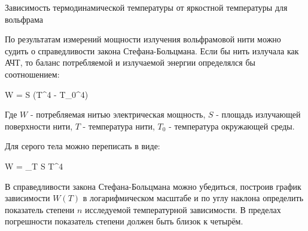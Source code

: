 {Зависимость термодинамической температуры от яркостной температуры для вольфрама}

По результатам измерений мощности излучения вольфрамовой нити можно судить о
справедливости закона Стефана-Больцмана. Если бы нить излучала как АЧТ, то баланс
потребляемой и излучаемой энергии определялся бы соотношением:

{ W = \sigma S (T^4 - T_0^4) }

Где $ W $ - потребляемая нитью электрическая мощность, $ S $ - площадь излучающей
поверхности нити, $ T $ - температура нити, $ T_0 $ - температура окружающей среды.

Для серого тела можно переписать в виде:

{ W = \varepsilon_T S \sigma T^4 }

В справедливости закона Стефана-Больцмана можно убедиться, построив график зависимости
$ W\left( T \right) $ в логарифмическом масштабе и по углу наклона определить показатель
степени $ n $ исследуемой температурной зависимости. В пределах погрешности показатель
степени должен быть близок к четырём.
